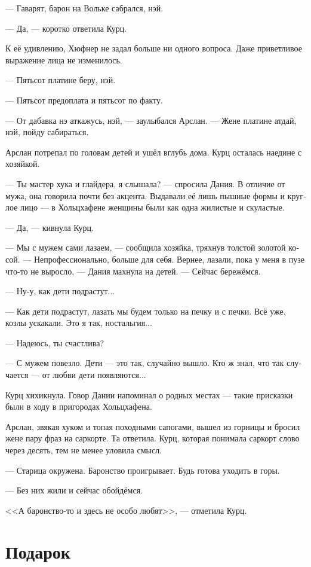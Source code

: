 \documentclass[a4paper,12pt,fleqn]{book}\usepackage{cooltooltips}\usepackage{polyglossia}\setdefaultlanguage[babelshorthands=true]{russian}\setotherlanguage{english}\defaultfontfeatures{Ligatures=TeX,Mapping=tex-text} \usepackage{xcolor}\definecolor{lightgray}{HTML}{bbbbbb}\color{lightgray}\newcommand{\ml}[3]{\textenglish{\textcolor{black}{#3}}}
\begin{document}
--- Гаварят, барон на Вольке сабрался, нэй.

--- Да, --- коротко ответила Курц.

К её удивлению, Хюфнер не задал больше ни одного вопроса.
Даже приветливое выражение лица не изменилось.

--- Пятьсот платине беру, нэй.

--- Пятьсот предоплата и пятьсот по факту.

--- От дабавка нэ аткажусь, нэй, --- заулыбался Арслан.
--- Жене платине атдай, нэй, пойду сабираться.

Арслан потрепал по головам детей и ушёл вглубь дома.
Курц осталась наедине с хозяйкой.

--- Ты мастер хука и глайдера, я слышала? --- спросила Дания.
В отличие от мужа, она говорила почти без акцента.
Выдавали её лишь пышные формы и круглое лицо --- в Хольцхафене женщины были как одна жилистые и скуластые.

--- Да, --- кивнула Курц.

--- Мы с мужем сами лазаем, --- сообщила хозяйка, тряхнув толстой золотой косой.
--- Непрофессионально, больше для себя.
Вернее, лазали, пока у меня в пузе что-то не выросло, --- Дания махнула на детей.
--- Сейчас бережёмся.

--- Ну-у, как дети подрастут...

--- Как дети подрастут, лазать мы будем только на печку и с печки.
Всё уже, козлы ускакали.
Это я так, ностальгия...

--- Надеюсь, ты счастлива?

--- С мужем повезло.
Дети --- это так, случайно вышло.
Кто ж знал, что так случается --- от любви дети появляются...

Курц хихикнула.
Говор Дании напоминал о родных местах --- такие присказки были в ходу в пригородах Хольцхафена.

Арслан, звякая хуком и топая походными сапогами, вышел из горницы и бросил жене пару фраз на саркорте.
Та ответила.
Курц, которая понимала саркорт слово через десять, тем не менее уловила смысл.

--- Старица окружена.
Баронство проигрывает.
Будь готова уходить в горы.

--- Без них жили и сейчас обойдёмся.

<<А баронство-то и здесь не особо любят>>, --- отметила Курц.


\chapter{Подарок}
\end{document}
